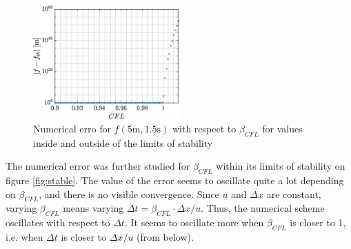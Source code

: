 \documentclass[a4paper,12pt,twoside]{article}
\begin{document}
    \begin{figure}
     \centering
     \includegraphics[width=0.5\textwidth]{graphs/convCFL.eps}
     \caption{Numerical erro for $f(5\text{m},1.5\text{s})$ with respect to $\beta_{CFL}$ for values inside and outside of the limits of stability}
     \label{fig:unstable}
    \end{figure}
    
    The numerical error was further studied for $\beta_{CFL}$ within its limits of stability on figure \ref{fig:stable}. The value of the error seems to oscillate quite a lot depending on $\beta_{CFL}$, and there is no visible convergence. Since $u$ and $\Delta x$ are constant, varying $\beta_{CFL}$ means varying $\Delta t=\beta_{CFL}\cdot \Delta x/u$. Thus, the numerical scheme oscillates with respect to $\Delta t$. It seems to oscillate more when $\beta_{CFL}$ is closer to 1, i.e. when $\Delta t$ is closer to $\Delta x/ u$ (from below).
    
\end{document}
